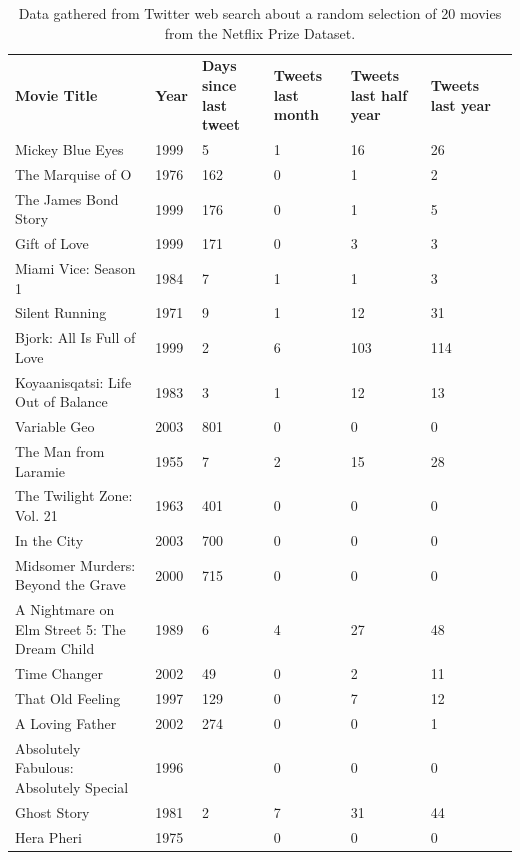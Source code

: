 \begin{table}[H]
\centering
\begin{tabularx}{5.3\textwidth}{ |p{7cm}|p{1cm}|p{1cm}|p{1cm}|p{1cm}|p{1cm}|p{1cm}| }
  \textbf{Movie Title}&\textbf{Year}&\textbf{Days since last tweet}&\textbf{Tweets last month}&\textbf{Tweets last half year}&\textbf{Tweets last year}\\
  \cline{0-5}
Mickey Blue Eyes&1999&5&1&16&26\\
  \cline{0-5}
The Marquise of O&1976&162&0&1&2\\
  \cline{0-5}
The James Bond Story&1999&176&0&1&5\\
  \cline{0-5}
Gift of Love&1999&171&0&3&3\\
  \cline{0-5}
Miami Vice: Season 1&1984&7&1&1&3\\
  \cline{0-5}
Silent Running&1971&9&1&12&31\\
  \cline{0-5}
Bjork: All Is Full of Love&1999&2&6&103&114\\
  \cline{0-5}
Koyaanisqatsi: Life Out of Balance&1983&3&1&12&13\\
  \cline{0-5}
Variable Geo&2003&801&0&0&0\\
  \cline{0-5}
The Man from Laramie&1955&7&2&15&28\\
  \cline{0-5}
The Twilight Zone: Vol. 21&1963&401&0&0&0\\
  \cline{0-5}
In the City&2003&700&0&0&0\\
  \cline{0-5}
Midsomer Murders: Beyond the Grave&2000&715&0&0&0\\
  \cline{0-5}
A Nightmare on Elm Street 5: The Dream Child&1989&6&4&27&48\\
  \cline{0-5}
Time Changer&2002&49&0&2&11\\
  \cline{0-5}
That Old Feeling&1997&129&0&7&12\\
  \cline{0-5}
A Loving Father&2002&274&0&0&1\\
  \cline{0-5}
Absolutely Fabulous: Absolutely Special&1996&&0&0&0\\
  \cline{0-5}
Ghost Story&1981&2&7&31&44\\
  \cline{0-5}
Hera Pheri&1975&&0&0&0
\end{tabularx}
\caption{Data gathered from Twitter web search about a random selection of 20 movies from the Netflix Prize Dataset.}
\label{table:stream-api-test-data}
\end{table}

